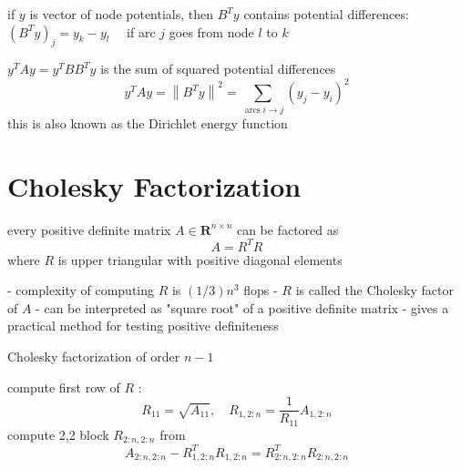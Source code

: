 \begin{theorem}
    if $ y $ is vector of node potentials, then $ B^{T} y $ contains potential differences:
$ \left(B^{T} y\right)_{j}=y_{k}-y_{l} \quad $ if arc $ j $ goes from node $ l $ to $ k $
\end{theorem}

\begin{theorem}
    $ y^{T} A y=y^{T} B B^{T} y $ is the sum of squared potential differences
$$
y^{T} A y=\left\|B^{T} y\right\|^{2}=\sum_{\operatorname{arcs} i \rightarrow j}\left(y_{j}-y_{i}\right)^{2}
$$
this is also known as the Dirichlet energy function
\end{theorem}

\section{Cholesky Factorization}

\begin{theorem}
    every positive definite matrix $ A \in \mathbf{R}^{n \times n} $ can be factored as
$$
A=R^{T} R
$$
where $ R $ is upper triangular with positive diagonal elements
\end{theorem}

- complexity of computing $ R $ is $ (1 / 3) n^{3} $ flops
- $ R $ is called the Cholesky factor of $ A $
- can be interpreted as "square root" of a positive definite matrix
- gives a practical method for testing positive definiteness

\begin{algorithm}
    \caption{Cholesky factorization of order $ n-1 $}
    \KwIn{$$
    \begin{aligned}
    \left[\begin{array}{cc}
    A_{11} & A_{1,2: n} \\
    A_{2: n, 1} & A_{2: n, 2: n}
    \end{array}\right] &=\left[\begin{array}{cc}
    R_{11} & 0 \\
    R_{1,2: n}^{T} & R_{2: n, 2: n}^{T}
    \end{array}\right]\left[\begin{array}{cc}
    R_{11} & R_{1,2: n} \\
    0 & R_{2: n, 2: n}
    \end{array}\right] \\
    &=\left[\begin{array}{cc}
    R_{11}^{2} & \\
    R_{11} R_{1,2: n}^{T} & R_{1,2: n}^{T} R_{1,2: n}+R_{2: n, 2: n}^{T} R_{2: n, 2: n}
    \end{array}\right]
    \end{aligned}
    $$}
    
compute first row of $ R $ :
$$
R_{11}=\sqrt{A_{11}}, \quad R_{1,2: n}=\frac{1}{R_{11}} A_{1,2: n}
$$\;
compute 2,2 block $ R_{2: n, 2: n} $ from
$$
A_{2: n, 2: n}-R_{1,2: n}^{T} R_{1,2: n}=R_{2: n, 2: n}^{T} R_{2: n, 2: n}
$$

\end{algorithm}

